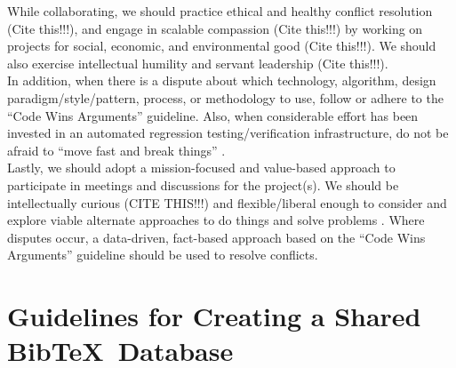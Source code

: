 \documentclass[letter,12pt]{article}
\begin{document}
While collaborating, we should practice ethical and healthy conflict resolution {\Huge (Cite this!!!)}, and engage in scalable compassion {\Huge (Cite this!!!)} by working on projects for social, economic, and environmental good {\Huge (Cite this!!!)}. We should also exercise intellectual humility and servant leadership {\Huge (Cite this!!!)}. \\





In addition, when there is a dispute about which technology, algorithm, design paradigm/style/pattern, process, or methodology to use, follow or adhere to the ``Code Wins Arguments'' \cite{Kushner2011,Zuckerberg2012} guideline. Also, when considerable effort has been invested in an automated regression testing/verification infrastructure, do not be afraid to ``move fast and break things'' \cite{Fong2011,Evangelista2012}. \\

Lastly, we should adopt a mission-focused and value-based approach to participate in meetings and discussions for the project(s). We should be intellectually curious {\Huge (CITE THIS!!!)} and flexible/liberal enough to consider and explore viable alternate approaches to do things and solve problems \cite{Beedle2001,Beedle2001a}. Where disputes occur, a data-driven, fact-based approach based on the ``Code Wins Arguments'' guideline should be used to resolve conflicts.

\section{Guidelines for Creating a Shared {\sc Bib}\TeX\ Database}
\label{sec:GuidelinesforCreatingaSharedBibTeXDatabase}
\end{document}
